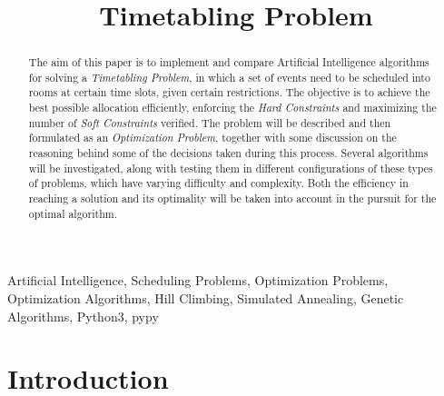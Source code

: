 \documentclass[conference]{IEEEtran}
\begin{document}
\title{Timetabling Problem}

\author{
\and
{}
\and
{}
}

\maketitle

\begin{abstract}

The aim of this paper is to implement and compare Artificial Intelligence algorithms for solving a \textit{Timetabling Problem}, in which a set of events need to be scheduled into rooms at certain time slots, given certain restrictions. The objective is to achieve the best possible allocation efficiently, enforcing the \textit{Hard Constraints} and maximizing the number of \textit{Soft Constraints} verified.
The problem will be described and then formulated as an \textit{Optimization Problem}, together with some discussion on the reasoning behind some of the decisions taken during this process.
Several algorithms will be investigated, along with testing them in different configurations of these types of problems, which have varying difficulty and complexity. Both the efficiency in reaching a solution and its optimality will be taken into account in the pursuit for the optimal algorithm.
\end{abstract}

\begin{IEEEkeywords}
Artificial Intelligence, Scheduling Problems, Optimization Problems, Optimization Algorithms, Hill Climbing, Simulated Annealing, Genetic Algorithms, Python3, pypy
\end{IEEEkeywords}

\section{Introduction}
\end{document}
